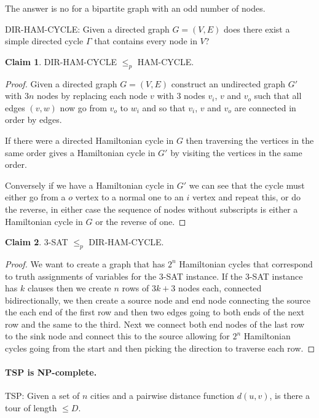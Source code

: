 \documentclass[11pt,a4paper]{article}
\theoremstyle{definition}
\newtheorem{claim}{Claim}
\begin{document}
The answer is no for a bipartite graph with an odd number of nodes.

DIR-HAM-CYCLE: Given a directed graph $G = (V,E)$ does there exist a simple directed cycle $\Gamma$ that contains every node in $V$?

\begin{claim}
DIR-HAM-CYCLE $\le_p$ HAM-CYCLE.
\end{claim}
\begin{proof}
Given a directed graph $G = (V,E)$ construct an undirected graph $G'$ with $3n$ nodes by replacing each node $v$ with 3 nodes $v_i$, $v$ and $v_o$ such that all edges $(v,w)$ now go from $v_o$ to $w_i$ and so that $v_i$, $v$ and $v_o$ are connected in order by edges.

If there were a directed Hamiltonian cycle in $G$ then traversing the vertices in the same order gives a Hamiltonian cycle in $G'$ by visiting the vertices in the same order.

Conversely if we have a Hamiltonian cycle in $G'$ we can see that the cycle must either go from a $o$ vertex to a normal one to an $i$ vertex and repeat this, or do the reverse, in either case the sequence of nodes without subscripts is either a Hamiltonian cycle in $G$ or the reverse of one.
\end{proof}

\begin{claim}
3-SAT $\le_p$ DIR-HAM-CYCLE.
\end{claim}
\begin{proof}
We want to create a graph that has $2^n$ Hamiltonian cycles that correspond to truth assignments of variables for the 3-SAT instance.
If the 3-SAT instance has $k$ clauses then we create $n$ rows of $3k + 3$ nodes each, connected bidirectionally, we then create a source node and end node connecting the source the each end of the first row and then two edges going to both ends of the next row and the same to the third.
Next we connect both end nodes of the last row to the sink node and connect this to the source allowing for $2^n$ Hamiltonian cycles going from the start and then picking the direction to traverse each row.%
\end{proof}

\paragraph{TSP is NP-complete.}
TSP: Given a set of $n$ cities and a pairwise distance function $d(u,v)$, is there a tour of length $\le D$.
\end{document}
